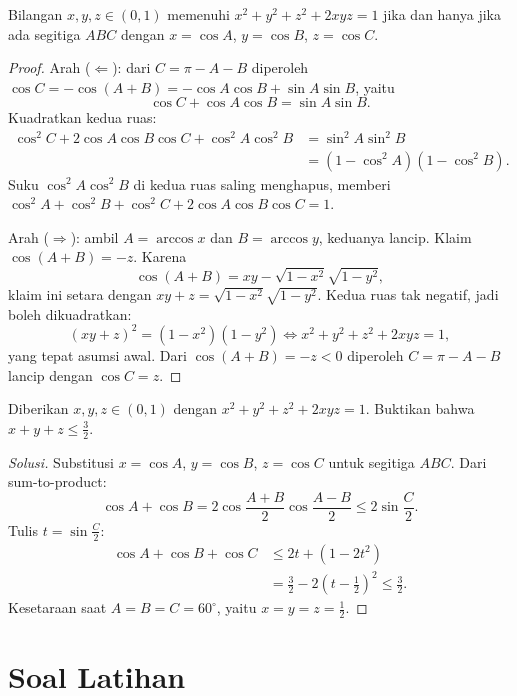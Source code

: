 \documentclass[12pt]{scrartcl}
\begin{document}
\begin{theorem}
Bilangan $x, y, z \in (0, 1)$ memenuhi $x^2 + y^2 + z^2 + 2xyz = 1$ jika dan
hanya jika ada segitiga $ABC$ dengan $x = \cos A$, $y = \cos B$, $z = \cos C$.
\end{theorem}
\begin{proof}
Arah ($\Leftarrow$): dari $C = \pi - A - B$ diperoleh
$\cos C = -\cos(A+B) = -\cos A\cos B + \sin A\sin B$, yaitu
\[ \cos C + \cos A\cos B = \sin A\sin B. \]
Kuadratkan kedua ruas:
\begin{align*}
\cos^2 C + 2\cos A\cos B\cos C + \cos^2 A\cos^2 B
&= \sin^2 A\sin^2 B \\
&= (1-\cos^2 A)(1-\cos^2 B).
\end{align*}
Suku $\cos^2 A\cos^2 B$ di kedua ruas saling menghapus, memberi
$\cos^2 A + \cos^2 B + \cos^2 C + 2\cos A\cos B\cos C = 1$.

Arah ($\Rightarrow$): ambil $A = \arccos x$ dan $B = \arccos y$, keduanya lancip.
Klaim $\cos(A+B) = -z$. Karena
\[ \cos(A+B) = xy - \sqrt{1-x^2}\sqrt{1-y^2}, \]
klaim ini setara dengan $xy + z = \sqrt{1-x^2}\sqrt{1-y^2}$.
Kedua ruas tak negatif, jadi boleh dikuadratkan:
\[ (xy+z)^2 = (1-x^2)(1-y^2) \iff x^2 + y^2 + z^2 + 2xyz = 1, \]
yang tepat asumsi awal. Dari $\cos(A+B) = -z < 0$ diperoleh
$C = \pi - A - B$ lancip dengan $\cos C = z$.
\end{proof}

\begin{example}
Diberikan $x, y, z \in (0, 1)$ dengan $x^2 + y^2 + z^2 + 2xyz = 1$.
Buktikan bahwa $x + y + z \le \frac32$.
\end{example}
\begin{proof}[Solusi]
Substitusi $x = \cos A$, $y = \cos B$, $z = \cos C$ untuk segitiga $ABC$.
Dari sum-to-product:
\[ \cos A + \cos B = 2\cos\frac{A+B}{2}\cos\frac{A-B}{2} \le 2\sin\frac{C}{2}. \]
Tulis $t = \sin\frac{C}{2}$:
\begin{align*}
\cos A + \cos B + \cos C &\le 2t + (1-2t^2) \\
&= \frac32 - 2\left(t-\frac12\right)^2 \le \frac32.
\end{align*}
Kesetaraan saat $A = B = C = 60^{\circ}$, yaitu $x = y = z = \frac12$.
\end{proof}


\part*{Soal Latihan}
\end{document}
